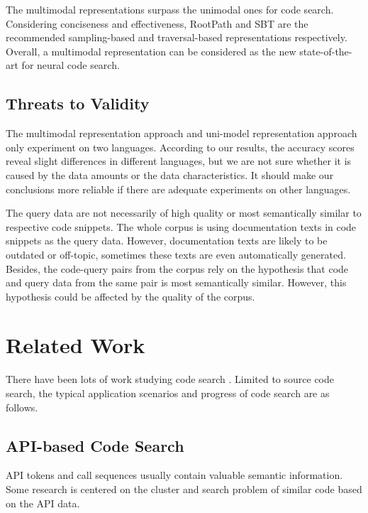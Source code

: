\documentclass[conference]{IEEEtran}
\begin{document}
\begin{tcolorbox}[fonttitle=\bfseries,title={Answer to Research Question 3}]
  \textbf{\rqccc}
  \tcblower
  The multimodal representations surpass the unimodal ones for code search. Considering conciseness and effectiveness, RootPath and SBT are the recommended sampling-based and traversal-based representations respectively.
  Overall, a multimodal representation can be considered as the new state-of-the-art for neural code search.
\end{tcolorbox}

\subsection{Threats to Validity}
\label{sec:discussion}

The multimodal representation approach and uni-model representation approach only experiment on two languages. According to our results, the accuracy scores reveal slight differences in different languages, but we are not sure whether it is caused by the data amounts or the data characteristics. It should make our conclusions more reliable if there are adequate experiments on other languages.

The query data are not necessarily of high quality or most semantically similar to respective code snippets. The whole corpus is using documentation texts in code snippets as the query data. However, documentation texts are likely to be outdated or off-topic, sometimes these texts are even automatically generated. Besides, the code-query pairs from the corpus rely on the hypothesis that code and query data from the same pair is most semantically similar. However, this hypothesis could be affected by the quality of the corpus.
 \section{Related Work}
\label{sec:related}

There have been lots of work studying code search \cite{Sadowski2015HowDS,Liu2020OpportunitiesAC}. Limited to source code search, the typical application scenarios and progress of code search are as follows.

\subsection{API-based Code Search}

API tokens and call sequences usually contain valuable semantic information. Some research is centered on the cluster and search problem of similar code based on the API data.
\end{document}
